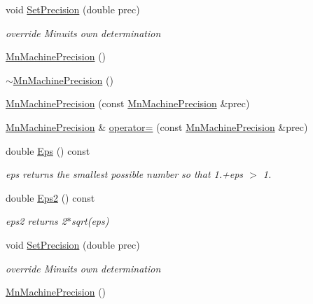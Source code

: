 \begin{DoxyCompactItemize}
void \mbox{\hyperlink{classROOT_1_1Minuit2_1_1MnMachinePrecision_a625938e3c6362a06d09fc76e59f366b6}{Set\+Precision}} (double prec)
\begin{DoxyCompactList}\small\item\em override Minuit\textquotesingle{}s own determination \end{DoxyCompactList}\item 
\mbox{\hyperlink{classROOT_1_1Minuit2_1_1MnMachinePrecision_aa40e069e8ca7ffc87ac53cdfebaf6316}{Mn\+Machine\+Precision}} ()
\item 
\mbox{\hyperlink{classROOT_1_1Minuit2_1_1MnMachinePrecision_abcef7b80562b246252decc15b6fabc71}{$\sim$\+Mn\+Machine\+Precision}} ()
\item 
\mbox{\hyperlink{classROOT_1_1Minuit2_1_1MnMachinePrecision_a7b8520f8d3479d7dd1b91a3bc3236281}{Mn\+Machine\+Precision}} (const \mbox{\hyperlink{classROOT_1_1Minuit2_1_1MnMachinePrecision}{Mn\+Machine\+Precision}} \&prec)
\item 
\mbox{\hyperlink{classROOT_1_1Minuit2_1_1MnMachinePrecision}{Mn\+Machine\+Precision}} \& \mbox{\hyperlink{classROOT_1_1Minuit2_1_1MnMachinePrecision_a89ded7be0c8fe34ad55585e45a078355}{operator=}} (const \mbox{\hyperlink{classROOT_1_1Minuit2_1_1MnMachinePrecision}{Mn\+Machine\+Precision}} \&prec)
\item 
double \mbox{\hyperlink{classROOT_1_1Minuit2_1_1MnMachinePrecision_a3a56da6043c5df1a98e5c8b1aa9f6d9f}{Eps}} () const
\begin{DoxyCompactList}\small\item\em eps returns the smallest possible number so that 1.+eps $>$ 1. \end{DoxyCompactList}\item 
double \mbox{\hyperlink{classROOT_1_1Minuit2_1_1MnMachinePrecision_aa71de131bc08f19d18dfeba4cb8191ce}{Eps2}} () const
\begin{DoxyCompactList}\small\item\em eps2 returns 2$\ast$sqrt(eps) \end{DoxyCompactList}\item 
void \mbox{\hyperlink{classROOT_1_1Minuit2_1_1MnMachinePrecision_a625938e3c6362a06d09fc76e59f366b6}{Set\+Precision}} (double prec)
\begin{DoxyCompactList}\small\item\em override Minuit\textquotesingle{}s own determination \end{DoxyCompactList}\item 
\mbox{\hyperlink{classROOT_1_1Minuit2_1_1MnMachinePrecision_aa40e069e8ca7ffc87ac53cdfebaf6316}{Mn\+Machine\+Precision}} ()

\end{DoxyCompactItemize}
